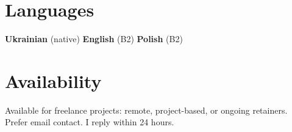 \documentclass[10pt,a4paper]{article}
\begin{document}
\section{Languages}
\textbf{Ukrainian} (native) \textbar{} \textbf{English} (B2) \textbar{} \textbf{Polish} (B2)

\section{Availability}
Available for freelance projects: remote, project-based, or ongoing retainers.
Prefer email contact. I reply within 24 hours.
\end{document}
